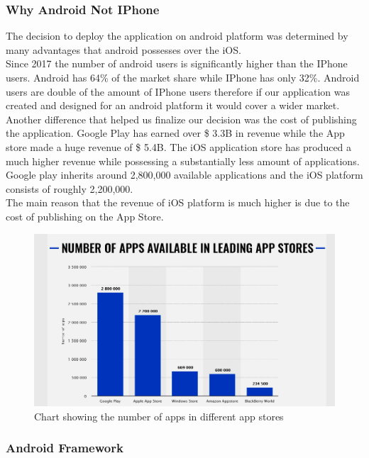 \documentclass[a4paper,12pt]{report}
\begin{document}
\subsubsection{Why Android Not IPhone}
The decision to deploy the application on android platform was determined by many advantages that android possesses over the iOS.\\
Since 2017 the number of android users is significantly higher than the IPhone users. Android has 64\% of the market share while IPhone has only 32\%.
Android users are double of the amount of IPhone users therefore if our application was created and designed for an android platform it would cover a wider market.\\

Another difference that helped us finalize our decision was the cost of publishing the application. Google Play has earned over \$ 3.3B in revenue while the App store made a huge revenue of \$ 5.4B. The iOS application store has produced a much higher revenue while possessing a substantially less amount of applications. Google play inherits around 2,800,000 available applications and the iOS platform consists of roughly 2,200,000.   
\\
The main reason that the revenue of iOS platform is much higher is due to the cost of publishing on the App Store.
\cite{android&iOS}

\begin{figure}[h]
    \begin{center}
    \includegraphics[scale=.5]{images/androidvsios.png}
    \caption{Chart showing the number of apps in different app stores}
    \label{fig:numberOfApp}
    \end{center}
\end{figure}


\subsubsection{Android Framework}
\end{document}
